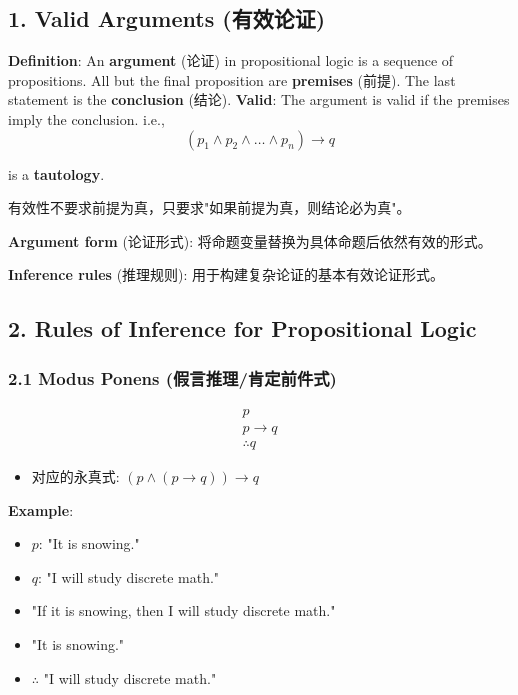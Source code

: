 \documentclass[10pt,a4paper,openany]{ctexbook}
\theoremstyle{definition}
\theoremstyle{remark}
\renewenvironment{quote}
  {\list{}{\leftmargin=1em\rightmargin=0pt\topsep=0.5pt\partopsep=0pt}\item[]}
  {\endlist}
\begin{document}
\subsection{1. Valid Arguments (有效论证)}

\textbf{Definition}: An \textbf{argument} (论证) in propositional logic is a sequence of propositions. All but the final proposition are \textbf{premises} (前提). The last statement is the \textbf{conclusion} (结论).
\textbf{Valid}: The argument is valid if the premises imply the conclusion. i.e.,
\[
(p_1 \land p_2 \land \dots \land p_n) \to q
\]

is a \textbf{tautology}.
\begin{quote}
有效性不要求前提为真，只要求"如果前提为真，则结论必为真"。

\textbf{Argument form} (论证形式): 将命题变量替换为具体命题后依然有效的形式。

\textbf{Inference rules} (推理规则): 用于构建复杂论证的基本有效论证形式。

\end{quote}
\vspace{-2pt}

\subsection{2. Rules of Inference for Propositional Logic}

\subsubsection{2.1 Modus Ponens (假言推理/肯定前件式)}

\[
\begin{array}{c}
p \\
p \to q \\
\hline
\therefore q
\end{array}
\]

\begin{itemize}
\item 对应的永真式: $(p \land (p \to q)) \to q$

\end{itemize}

\textbf{Example}:
\begin{itemize}
\item $p$: "It is snowing."
\item $q$: "I will study discrete math."
\item "If it is snowing, then I will study discrete math."
\item "It is snowing."
\item $\therefore$ "I will study discrete math."

\end{itemize}
\end{document}
